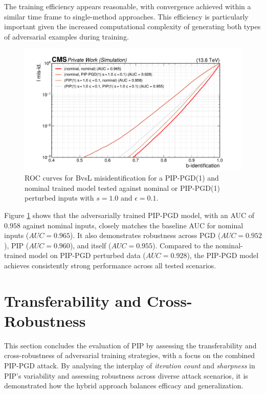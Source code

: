 The training efficiency appears reasonable, with convergence achieved within a similar time frame to single-method approaches. This efficiency is particularly important given the increased computational complexity of generating both types of adversarial examples during training.

\begin{figure}[h]
\centering
    \includegraphics[width=15cm]{media/output/roc_bvsl_combined_crossing.pdf}
    \caption{ROC curves for BvsL misidentification for a PIP-PGD(1) and nominal trained model tested against nominal or PIP-PGD(1) perturbed inputs with $s=1.0$ and $\epsilon=0.1$.}
    \label{fig:joint_training_crossing}
\end{figure}

Figure \ref{fig:joint_training_crossing} shows that the adversarially trained PIP-PGD model, with an AUC of $0.958$ against nominal inputs, closely matches the baseline AUC for nominal inputs ($AUC = 0.965$). It also demonstrates robustness across PGD ($AUC = 0.952$), PIP ($AUC = 0.960$), and itself ($AUC = 0.955$). Compared to the nominal-trained model on PIP-PGD perturbed data ($AUC = 0.928$), the PIP-PGD model achieves consistently strong performance across all tested scenarios.




\FloatBarrier
\section{Transferability and Cross-Robustness}

This section concludes the evaluation of PIP by assessing the transferability and cross-robustness of adversarial training strategies, with a focus on the combined PIP-PGD attack. By analysing the interplay of \textit{iteration count} and \textit{sharpness} in PIP’s variability and assessing robustness across diverse attack scenarios, it is demonstrated how the hybrid approach balances efficacy and generalization.

